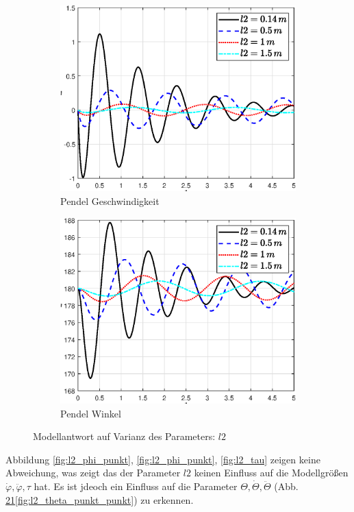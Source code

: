 \begin{figure}
    \begin{subfigure}[b]{0.49\linewidth}
        \includegraphics[width=\linewidth]{plot_data/parameter/fig/l2/theta_punkt.eps}
        \caption{Pendel Geschwindigkeit}
        \label{fig:l2_theta_punkt}      
    \end{subfigure}
    \begin{subfigure}[b]{0.49\linewidth}
        \includegraphics[width=\linewidth]{plot_data/parameter/fig/l2/theta.eps}
        \caption{Pendel Winkel}
        \label{fig:l2_theta}
    \end{subfigure}
        \caption{Modellantwort auf Varianz des Parameters: $l2$}
        \label{fig:l2}
\end{figure}
Abbildung \ref{fig:l2_phi_punkt}, \ref{fig:l2_phi_punkt}, \ref{fig:l2_tau} zeigen keine Abweichung, was zeigt das der Parameter $l2$ keinen Einfluss auf die Modellgrößen $\dot\varphi,\ddot\varphi,\tau$ hat.
Es ist jdeoch ein Einfluss auf die Parameter $\Theta,\dot\Theta,\ddot\Theta$ (Abb. \ref{fig:l2_theta}\ref{fig:l2_theta_punkt}\ref{fig:l2_theta_punkt_punkt}) zu erkennen. 

